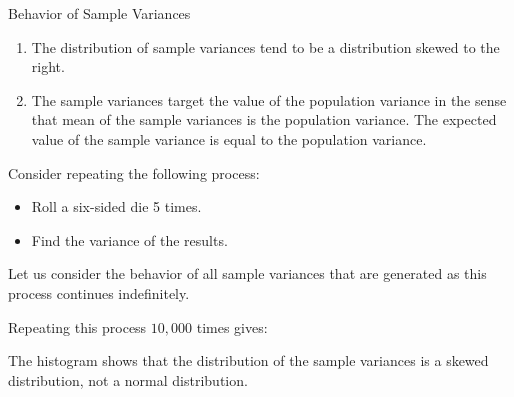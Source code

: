 \documentclass{beamer}
\begin{document}
\begin{frame}
\begin{block}{Behavior of Sample Variances}
\begin{enumerate}
\item<1-> The distribution of sample variances tend to be a distribution skewed to the right.
\item<2-> The sample variances target the value of the population variance in the sense that mean of the sample variances is the population variance. The expected value of the sample variance is equal to the population variance.
\end{enumerate}
\end{block}
\end{frame}

\begin{frame}
\begin{example}
Consider repeating the following process:
\begin{itemize}
\item Roll a six-sided die 5 times.
\item Find the variance of the results.
\end{itemize}\pause
Let us consider the behavior of all sample variances that are generated as this process continues indefinitely.\pause

\vspace{2mm}
Repeating this process $10,000$ times gives:

\vspace{-5mm}
\begin{center}
\end{center}\pause

\vspace{-5mm}
The histogram shows that the distribution of the sample variances is a skewed distribution, not a normal distribution.
\end{example}
\end{frame}
\end{document}
